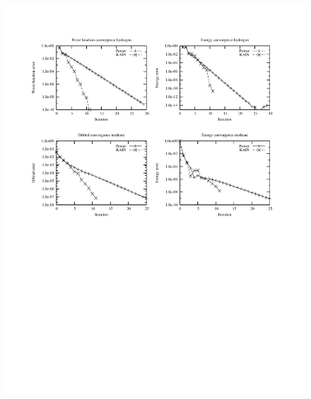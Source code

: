 \begin{frame}
\begin{columns}
\begin{column}[b]{0.6\textwidth}
    \begin{figure}
        \includegraphics[scale=0.6, clip, viewport = 50 350 300 540]
        {figures/convergence.pdf}
    \end{figure}

    \end{column}
    \end{columns}
\end{frame}



